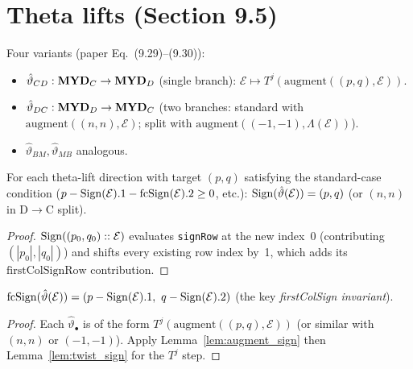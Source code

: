 \section{Theta lifts (Section 9.5)}

\begin{definition}
  \label{def:thetaLift}
  \leanok
  Four variants (paper Eq.~(9.29)--(9.30)):
  \begin{itemize}
    \item $\hat\vartheta_{CD} : \mathbf{MYD}_C \to \mathbf{MYD}_D$ (single branch): $\mathcal{E} \mapsto T^j(\mathrm{augment}((p, q), \mathcal{E}))$.
    \item $\hat\vartheta_{DC} : \mathbf{MYD}_D \to \mathbf{MYD}_C$ (two branches: standard with $\mathrm{augment}((n, n), \mathcal{E})$; split with $\mathrm{augment}((-1, -1), \Lambda(\mathcal{E}))$).
    \item $\hat\vartheta_{BM}, \hat\vartheta_{MB}$ analogous.
  \end{itemize}
\end{definition}

\begin{theorem}
  \label{thm:thetaLift_sign}
  \leanok
  For each theta-lift direction with target $(p, q)$ satisfying the
  standard-case condition ($p - \mathrm{Sign}(\mathcal{E}).1 - \mathrm{fcSign}(\mathcal{E}).2 \geq 0$, etc.):
  $\mathrm{Sign}(\hat\vartheta(\mathcal{E})) = (p, q)$ (or $(n, n)$ in D$\to$C split).
\end{theorem}
\begin{proof}
  \leanok
  $\mathrm{Sign}((p_0, q_0) :: \mathcal{E})$ evaluates \texttt{signRow} at the new index~0 (contributing $(|p_0|, |q_0|)$) and shifts every existing row index by~1, which adds its $\mathrm{firstColSignRow}$ contribution.
\end{proof}


\begin{theorem}
  \label{thm:thetaLift_fcSign}
  \leanok
  $\mathrm{fcSign}(\hat\vartheta(\mathcal{E})) = (p - \mathrm{Sign}(\mathcal{E}).1,\ q - \mathrm{Sign}(\mathcal{E}).2)$
  (the key \emph{firstColSign invariant}).
\end{theorem}
\begin{proof}
  \leanok
  Each $\hat\vartheta_\bullet$ is of the form $T^j(\mathrm{augment}((p, q), \mathcal{E}))$ (or similar with $(n, n)$ or $(-1, -1)$). Apply Lemma~\ref{lem:augment_sign} then Lemma~\ref{lem:twist_sign} for the $T^j$ step.
\end{proof}


